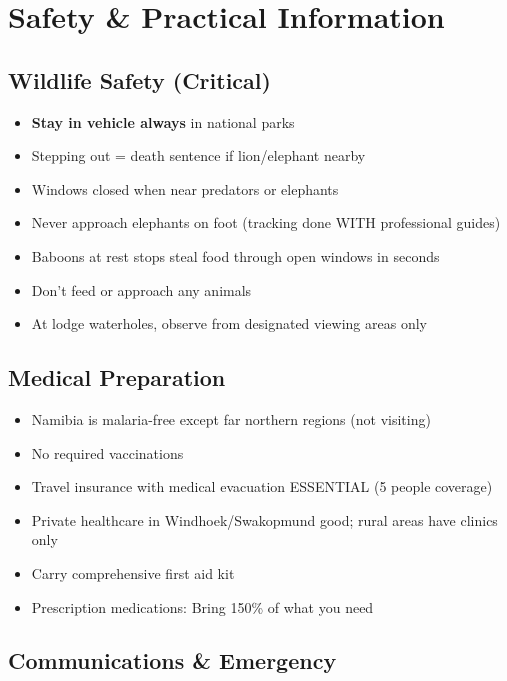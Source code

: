 \documentclass[11pt]{article}
\begin{document}
\clearpage
\section{Safety \& Practical Information}

\subsection{Wildlife Safety (Critical)}

\begin{itemize}
    \item \textcolor{warningcolor}{\textbf{Stay in vehicle always}} in national parks
    \item Stepping out = death sentence if lion/elephant nearby
    \item Windows closed when near predators or elephants
    \item Never approach elephants on foot (tracking done WITH professional guides)
    \item Baboons at rest stops steal food through open windows in seconds
    \item Don't feed or approach any animals
    \item At lodge waterholes, observe from designated viewing areas only
\end{itemize}

\subsection{Medical Preparation}

\begin{itemize}
    \item Namibia is malaria-free except far northern regions (not visiting)
    \item No required vaccinations
    \item Travel insurance with medical evacuation ESSENTIAL (5 people coverage)
    \item Private healthcare in Windhoek/Swakopmund good; rural areas have clinics only
    \item Carry comprehensive first aid kit
    \item Prescription medications: Bring 150\% of what you need
\end{itemize}

\subsection{Communications \& Emergency}
\end{document}
